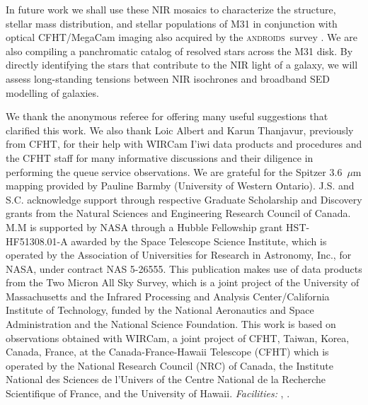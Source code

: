 \documentclass[iop,tighten]{emulateapj}
\newcommand{\androids}{\textsc{androids}}
\begin{document}
In future work we shall use these NIR mosaics to characterize the structure, stellar mass distribution, and stellar populations of M31 in conjunction with optical CFHT/MegaCam imaging also acquired by the \androids\ survey \citep{Sick:2013a}.
We are also compiling a panchromatic catalog of resolved stars across the M31 disk.
By directly identifying the stars that contribute to the NIR light of a galaxy, we will assess long-standing tensions between NIR isochrones and broadband SED modelling of galaxies.


\bigskip We thank the anonymous referee for offering many useful suggestions that clarified this work.
We also thank Loic Albert and Karun Thanjavur, previously from CFHT, for their help with WIRCam I'iwi data products and procedures and the CFHT staff for many informative discussions and their diligence in performing the queue service observations.
We are grateful for the Spitzer 3.6~$\mu$m mapping provided by Pauline Barmby (University of Western Ontario).
J.S. and S.C. acknowledge support through respective Graduate Scholarship and Discovery grants from the Natural Sciences and Engineering Research Council of Canada.
M.M is supported by NASA through a Hubble Fellowship grant HST-HF51308.01-A awarded by the Space Telescope Science Institute, which is operated by the Association of Universities for Research in Astronomy, Inc., for NASA, under contract NAS 5-26555.
This publication makes use of data products from the Two Micron All Sky Survey, which is a joint project of the University of Massachusetts and the Infrared Processing and Analysis Center/California Institute of Technology, funded by the National Aeronautics and Space Administration and the National Science Foundation.
This work is based on observations obtained with WIRCam, a joint project of CFHT, Taiwan, Korea, Canada, France, at the Canada-France-Hawaii Telescope (CFHT) which is operated by the National Research Council (NRC) of Canada, the Institute National des Sciences de l'Univers of the Centre National de la Recherche Scientifique of France, and the University of Hawaii. 
{\it Facilities:} , .


\end{document}
